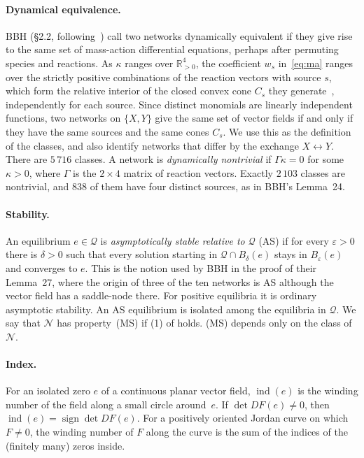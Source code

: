 \documentclass[11pt,a4paper]{report}
\providecommand{\R}{\mathbb{R}}
\newcommand{\Q}{\mathcal{Q}}
\newcommand{\Net}{\mathcal{N}}
\newcommand{\indx}{\operatorname{ind}}
\begin{document}
\paragraph{Dynamical equivalence.} BBH (§2.2, following~\autocite{CraciunPantea2008}) call two networks
dynamically equivalent if they give rise to the same set of mass-action differential equations, perhaps after
permuting species and reactions. As \(\kappa\) ranges over \(\R^4_{>0}\), the coefficient \(w_s\) in~\eqref{eq:ma}
ranges over the strictly positive combinations of the reaction vectors with source \(s\), which form the relative
interior of the closed convex cone \(C_s\) they generate~\autocite[Cor.~6.6.2]{Rockafellar1970}, independently for
each source. Since distinct monomials are linearly independent functions, two networks on \(\{X,Y\}\) give the same
set of vector fields if and only if they have the same sources and the same cones \(C_s\). We use this as the
definition of the classes, and also identify networks that differ by the exchange \(X\leftrightarrow Y\). There are
\(5\,716\) classes. A network is \emph{dynamically nontrivial} if \(\Gamma\kappa=0\) for some \(\kappa>0\), where
\(\Gamma\) is the \(2\times4\) matrix of reaction vectors. Exactly \(2\,103\) classes are nontrivial, and \(838\) of
them have four distinct sources, as in BBH's Lemma~24.

\paragraph{Stability.} An equilibrium \(e\in\Q\) is \emph{asymptotically stable relative to \(\Q\)} (AS) if for every
\(\varepsilon>0\) there is \(\delta>0\) such that every solution starting in \(\Q\cap B_\delta(e)\) stays in
\(B_\varepsilon(e)\) and converges to \(e\). This is the notion used by BBH in the proof of their Lemma~27, where the
origin of three of the ten networks is AS although the vector field has a saddle-node there. For positive equilibria
it is ordinary asymptotic stability. An AS equilibrium is isolated among the equilibria in \(\Q\). We say that
\(\Net\) has property~(MS) if (1) of  holds. (MS) depends only on the class of~\(\Net\).

\paragraph{Index.} For an isolated zero \(e\) of a continuous planar vector field, \(\indx(e)\) is the winding number
of the field along a small circle around~\(e\). If \(\det DF(e)\neq0\), then \(\indx(e)=\operatorname{sign}\det
DF(e)\). For a positively oriented Jordan curve on which \(F\neq0\), the winding number of \(F\) along the curve is
the sum of the indices of the (finitely many) zeros inside.
\end{document}
